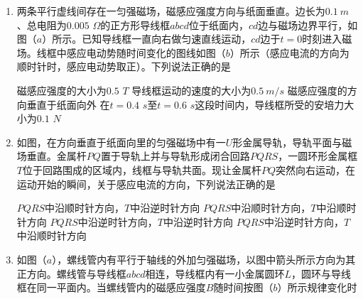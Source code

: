 \begin{enumerate}
\begin{minipage}[h!]{0.7\linewidth}
\vspace{0.3em}
\end{minipage}
\hfill
\begin{minipage}[h!]{0.3\linewidth}
\flushright
\vspace{0.3em}

\vspace{0.3em}
\end{minipage}


\item 
{}
两条平行虚线间存在一匀强磁场，磁感应强度方向与纸面垂直。边长为$ 0.1 \ m $、总电阻为$ 0.005 $ $ \Omega $的正方形导线框$ abcd $位于纸面内，$ cd $边与磁场边界平行，如图（$ a $）所示。已知导线框一直向右做匀速直线运动，$ cd $边于$ t=0 $时刻进入磁场。线框中感应电动势随时间变化的图线如图（$ b $）所示（感应电流的方向为顺时针时，感应电动势取正）。下列说法正确的是  
\begin{figure}[h!]
\centering

\end{figure}


\fourchoices
{磁感应强度的大小为$ 0.5 $ $ T $}
{导线框运动的速度的大小为$ 0.5 \ m/s $}
{磁感应强度的方向垂直于纸面向外}
{在$ t=0.4 $ $ s $至$ t=0.6 $ $ s $这段时间内，导线框所受的安培力大小为$ 0.1 $ $ N $}





\item 
{}
如图，在方向垂直于纸面向里的匀强磁场中有一$ U $形金属导轨，导轨平面与磁场垂直。金属杆$ PQ $置于导轨上并与导轨形成闭合回路$ PQRS $，一圆环形金属框$ T $位于回路围成的区域内，线框与导轨共面。现让金属杆$ PQ $突然向右运动，在运动开始的瞬间，关于感应电流的方向，下列说法正确的是  
\begin{figure}[h!]
\centering

\end{figure}


\fourchoices
{$ PQRS $中沿顺时针方向，$ T $中沿逆时针方向}
{$ PQRS $中沿顺时针方向，$ T $中沿顺时针方向}
{$ PQRS $中沿逆时针方向，$ T $中沿逆时针方向}
{$ PQRS $中沿逆时针方向，$ T $中沿顺时针方向}


\item 
{}
如图（$ a $），螺线管内有平行于轴线的外加匀强磁场，以图中箭头所示方向为其正方向。螺线管与导线框$ abcd $相连，导线框内有一小金属圆环$ L $，圆环与导线框在同一平面内。当螺线管内的磁感应强度$ B $随时间按图（$ b $）所示规律变化时  
\begin{figure}[h!]
\centering

\end{figure}




\end{enumerate}
